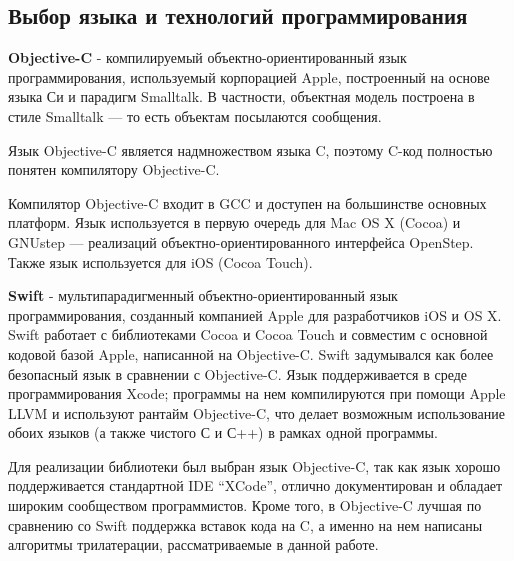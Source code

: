 \subsection{Выбор языка и технологий программирования}

\textbf{Objective-C} - компилируемый объектно-ориентированный язык программирования, используемый корпорацией Apple, построенный на основе языка Си и парадигм Smalltalk. В частности, объектная модель построена в стиле Smalltalk — то есть объектам посылаются сообщения.

Язык Objective-C является надмножеством языка C, поэтому C-код полностью понятен компилятору Objective-C.

Компилятор Objective-C входит в GCC и доступен на большинстве основных платформ. Язык используется в первую очередь для Mac OS X (Cocoa) и GNUstep — реализаций объектно-ориентированного интерфейса OpenStep. Также язык используется для iOS (Cocoa Touch).

\textbf{Swift} - мультипарадигменный объектно-ориентированный язык программирования, созданный компанией Apple для разработчиков iOS и OS X. Swift работает с библиотеками Cocoa и Cocoa Touch и совместим с основной кодовой базой Apple, написанной на Objective-C. Swift задумывался как более безопасный язык в сравнении с Objective-C. Язык поддерживается в среде программирования Xcode; программы на нем компилируются при помощи Apple LLVM и используют рантайм Objective-C, что делает возможным использование обоих языков (а также чистого С и С++) в рамках одной программы.

Для реализации библиотеки был выбран язык Objective-C, так как язык хорошо поддерживается стандартной IDE “XCode”, отлично документирован и обладает широким сообществом программистов. Кроме того, в Objective-C лучшая по сравнению со Swift поддержка вставок кода на C, а именно на нем написаны алгоритмы трилатерации, рассматриваемые в данной работе.